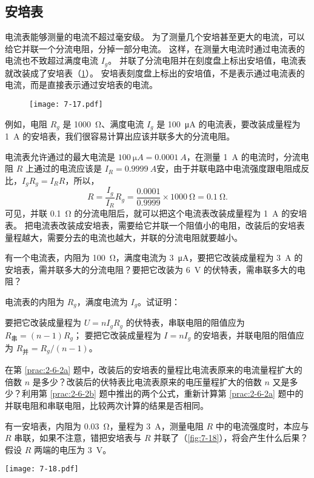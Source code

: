 \subsection{安培表}
电流表能够测量的电流不超过毫安级。
为了测量几个安培甚至更大的电流，可以给它并联一个分流电阻，分掉一部分电流。
这样，在测量大电流时通过电流表的电流也不致超过满度电流 $I_g$。
并联了分流电阻并在刻度盘上标出安培值，电流表就改装成了安培表（\cref{fig:7-17}）。
安培表刻度盘上标出的安培值，不是表示通过电流表的电流，而是直接表示通过安培表的电流。
\begin{figure}
  \texttt{[image: 7-17.pdf]}
  \caption{}\label{fig:7-17}
\end{figure}	

例如，电阻 $R_g$ 是 \qty{1000}{\ohm}、满度电流 $I_g$ 是 \qty{100}{\micro A} 的电流表，要改装成量程为 \qty{1}{A} 的安培表，我们很容易计算出应该并联多大的分流电阻。

电流表允许通过的最大电流是 $\qty{100}{\micro A} =\qty{0.0001}{A}$，在测量 \qty{1}{A} 的电流时，分流电阻 $R$ 上通过的电流应该是 $I_R=\qty{0.9999}{A}$安，由于并联电路中电流强度跟电阻成反比，$I_gR_g=I_R R$，所以，
\[R=\frac{I_g}{I_R}R_g=\frac{0.0001}{0.9999}\times \qty{1000}{\ohm}=\qty{0.1}{\ohm}.\]
可见，并联 \qty{0.1}{\ohm} 的分流电阻后，就可以把这个电流表改装成量程为 \qty{1}{A} 的安培表。
把电流表改装成安培表，需要给它并联一个阻值小的电阻，改装后的安培表量程越大，需要分去的电流也越大，并联的分流电阻就要越小。

\begin{Practice}
\begin{question}
  \item 有一个电流表，内阻为 \qty{100}{\ohm}，满度电流为 \qty{3}{\micro A}，要把它改装成量程为 \qty{3}{A} 的安培表，需并联多大的分流电阻？要把它改装为 \qty{6}{V} 的伏特表，需串联多大的电阻？
  \item 电流表的内阻为 $R_g$，满度电流为 $I_g$。试证明：
  \begin{tasks}
    \task\label{prac:2-6-2a} 要把它改装成量程为 $U=nI_gR_g$ 的伏特表，串联电阻的阻值应为 $R_{\text{串}}=(n-1)R_g$；
    \task\label{prac:2-6-2b} 要把它改装成量程为 $I=nI_g$ 的安培表，并联电阻的阻值应为 $R_{\text{并}}=R_g/(n-1)$。
  \end{tasks}
  \item 在第 \ref{prac:2-6-2a} 题中，改装后的安培表的量程比电流表原来的电流量程扩大的倍数 $n$ 是多少？改装后的伏特表比电流表原来的电压量程扩大的倍数 $n$ 又是多少？利用第 \ref{prac:2-6-2b} 题中推出的两个公式，重新计算第 \ref{prac:2-6-2a} 题中的并联电阻和串联电阻，比较两次计算的结果是否相同。
  \item 有一安培表，内阻为 \qty{0.03}{\ohm}，量程为 \qty{3}{A}，测量电阻 $R$ 中的电流强度时，本应与 $R$ 串联，如果不注意，错把安培表与 $R$ 并联了（\cref{fig:7-18}），将会产生什么后果？假设 $R$ 两端的电压为 \qty{3}{V}。
  \begin{figurehere}
    \begin{minipage}{\linewidth}\centering
      \texttt{[image: 7-18.pdf]}
      \caption{}\label{fig:7-18}
    \end{minipage}
  \end{figurehere}	
\end{question}
\end{Practice}

